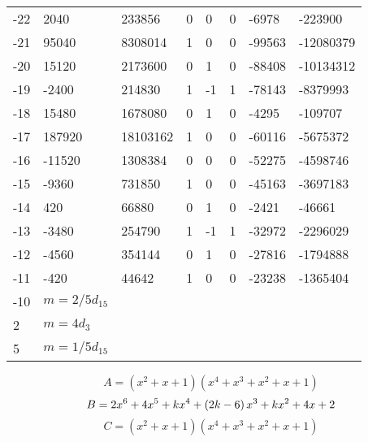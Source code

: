 \documentclass{amsart}
\begin{document}
\begin{longtable}{|l|l|l|lllll|}
-22&2040&233856&0&0&0&-6978&-223900\\
-21&95040&8308014&1&0&0&-99563&-12080379\\
-20&15120&2173600&0&1&0&-88408&-10134312\\
-19&-2400&214830&1&-1&1&-78143&-8379993\\
-18&15480&1678080&0&1&0&-4295&-109707\\
-17&187920&18103162&1&0&0&-60116&-5675372\\
-16&-11520&1308384&0&0&0&-52275&-4598746\\
-15&-9360&731850&1&0&0&-45163&-3697183\\
-14&420&66880&0&1&0&-2421&-46661\\
-13&-3480&254790&1&-1&1&-32972&-2296029\\
-12&-4560&354144&0&1&0&-27816&-1794888\\
-11&-420&44642&1&0&0&-23238&-1365404\\
-10&$m=2/5d_{15}$&&\multicolumn{5}{c|}{}\\
2&$m=4d_{3}$&&\multicolumn{5}{c|}{}\\
5&$m=1/5d_{15}$&&\multicolumn{5}{c|}{}\\
\hline
\end{longtable}
$$A=(x^2
 + x
 + 1)(x^4
 + x^3
 + x^2
 + x
 + 1)$$
$$B=2\*x^6
 + 4\*x^5
 + k\*x^4
 + \left(2\*k
 - 6\right) \*x^3
 + k\*x^2
 + 4\*x
 + 2$$
$$C=(x^2
 + x
 + 1)(x^4
 + x^3
 + x^2
 + x
 + 1)$$
\end{document}
